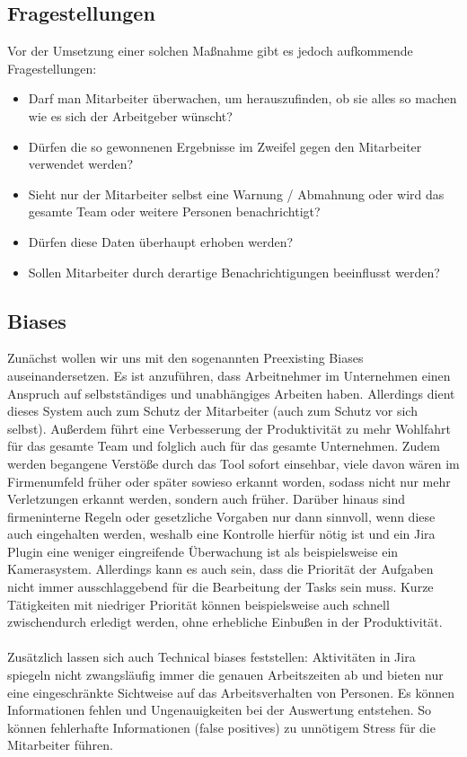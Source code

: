\documentclass[a4paper,12pt,]{article}
\begin{document}
\subsection{Fragestellungen}
Vor der Umsetzung einer solchen Maßnahme gibt es jedoch
aufkommende Fragestellungen:
\begin{itemize}
\item Darf man Mitarbeiter überwachen, um herauszufinden, ob sie alles so machen wie es sich der Arbeitgeber wünscht?
\item Dürfen die so gewonnenen Ergebnisse im Zweifel gegen den Mitarbeiter verwendet werden?
\item Sieht nur der Mitarbeiter selbst eine Warnung / Abmahnung oder wird das gesamte Team oder weitere Personen benachrichtigt?
\item Dürfen diese Daten überhaupt erhoben werden?
\item Sollen Mitarbeiter durch derartige Benachrichtigungen beeinflusst werden?
\end{itemize}

\subsection{Biases}
Zunächst wollen wir uns mit den sogenannten Preexisting Biases auseinandersetzen.
Es ist anzuführen, dass Arbeitnehmer im Unternehmen einen Anspruch auf selbstständiges und unabhängiges Arbeiten haben. Allerdings dient dieses System auch zum Schutz der Mitarbeiter (auch zum Schutz vor sich selbst).
Außerdem führt eine Verbesserung der Produktivität zu mehr Wohlfahrt für das gesamte Team und folglich auch für das gesamte Unternehmen.
Zudem werden begangene Verstöße durch das Tool sofort einsehbar, viele davon wären im Firmenumfeld früher oder später sowieso erkannt worden, sodass nicht nur mehr Verletzungen erkannt werden, sondern auch früher.
Darüber hinaus sind firmeninterne Regeln oder gesetzliche Vorgaben nur dann sinnvoll, wenn diese auch eingehalten werden, weshalb eine Kontrolle hierfür nötig ist und ein Jira Plugin eine weniger eingreifende Überwachung ist als beispielsweise ein Kamerasystem.
Allerdings kann es auch sein, dass die Priorität der Aufgaben nicht immer ausschlaggebend für die Bearbeitung der Tasks sein muss. Kurze Tätigkeiten mit niedriger Priorität können beispielsweise auch schnell zwischendurch erledigt werden, ohne erhebliche Einbußen in der Produktivität.

\paragraph{}Zusätzlich lassen sich auch Technical biases feststellen: Aktivitäten in Jira spiegeln nicht zwangsläufig immer die genauen Arbeitszeiten ab und bieten nur eine eingeschränkte Sichtweise auf das Arbeitsverhalten von Personen. Es können Informationen fehlen und Ungenauigkeiten bei der Auswertung entstehen. So können fehlerhafte Informationen (false positives) zu unnötigem Stress für die Mitarbeiter führen.
\end{document}
